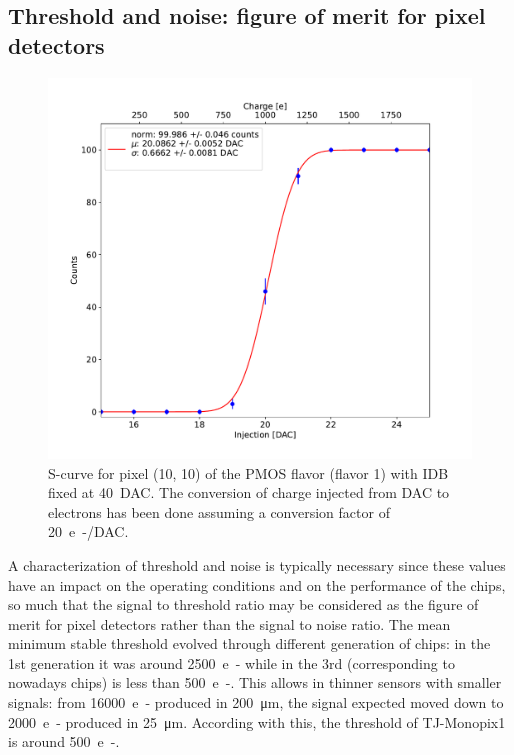     \subsection{Threshold and noise: figure of merit for pixel detectors}
        \begin{figure}[h!]
            \centering
            \includegraphics[width=.6\linewidth]{figures/charaterization/scurve.pdf}
            \caption{S-curve for pixel (10, 10) of the PMOS flavor (flavor 1) with IDB fixed at \SI{40}{DAC}. The conversion of charge injected from DAC to electrons has been done assuming a conversion factor of \SI{20}{e-/DAC}. }
            \label{fig:scurve}
        \end{figure}              
        A characterization of threshold and noise is typically necessary since these values have an impact on the operating conditions and on the performance of the chips, so much that the signal to threshold ratio may be considered as the figure of merit for pixel detectors rather than the signal to noise ratio.
        The mean minimum stable threshold evolved through different generation of chips: in the 1st generation it was around \SI{2500}{e-} while in the 3rd (corresponding to nowadays chips) is less than \SI{500}{e-}. This allows in thinner sensors with smaller signals: from \SI{16000}{e-} produced in \SI{200}{\um}, the signal expected moved down to \SI{2000}{e-} produced in \SI{25}{\um}. According with this, the threshold of TJ-Monopix1 is around \SI{500}{e-}.
 
